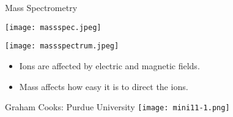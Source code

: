 \documentclass[notes=only]{beamer}
\begin{document}
\begin{frame}{Mass Spectrometry}
	\begin{center}
		\texttt{[image: massspec.jpeg]}
	\end{center}

	\begin{minipage}{0.3\linewidth}
		\texttt{[image: massspectrum.jpeg]}
	\end{minipage}
	\hfill
	\begin{minipage}{0.65\linewidth}
		\begin{itemize}
			\item \alert{Ions} are affected by electric and magnetic
				fields.
			\item \alert{Mass} affects how easy it is to direct the
				ions.
		\end{itemize}
	\end{minipage}
\end{frame}


\begin{frame}{Graham Cooks: Purdue University}
	\centering
	\texttt{[image: mini11-1.png]}
\end{frame}

\end{document}
